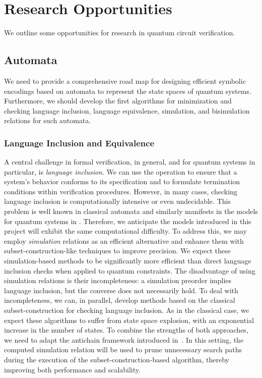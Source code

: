 \section{Research Opportunities}
\label{opportunities:section}
We outline some opportunities for research in quantum circuit verification.

\subsection{Automata}
\label{automata:subsection}
We need to provide a comprehensive road map for designing efficient symbolic encodings based on automata to represent the state spaces of quantum systems.
%
Furthermore, we should develop the first algorithms for minimization and checking language inclusion, language equivalence, simulation, and bisimulation
relations for such automata.
%

\subsubsection{Language Inclusion and Equivalence}
A central challenge in formal verification, in general, and for quantum systems in particular, is \textit{language inclusion}.
%
We can use the operation to ensure that a system's behavior conforms to its specification and to formulate termination conditions within verification procedures.
%
However, in many cases, checking language inclusion is computationally intensive or even undecidable.
%
This problem is well known in classical automata and similarly manifests in the models for quantum systems in \citep{DBLP:journals/pacmpl/AbdullaCCHLLLT25}.
%
Therefore, we anticipate the models introduced in this project will exhibit the same computational difficulty.
%
To address this, we may employ \textit{simulation} relations as an efficient alternative and enhance them with subset-construction-like techniques to improve precision.
%
We expect these simulation-based methods to be significantly more efficient than direct language inclusion checks when applied to quantum constraints.
%
%
The disadvantage of using simulation relations is their incompleteness: a simulation preorder implies language inclusion, but the converse does not necessarily hold.
%
To deal with incompleteness, we can, in parallel, develop methods based on the classical subset-construction for checking language inclusion.
%
As in the classical case, we expect these algorithms to suffer from state space explosion, with an exponential increase in the number of states.
%
To combine the strengths of both approaches, we need to adapt the antichain framework introduced in~\citep{wulfantichains,DBLP:conf/tacas/AbdullaCHMV10}.
%
In this setting, the computed simulation relation will be used to prune unnecessary search paths during the execution of the subset-construction-based algorithm, thereby improving both performance and scalability.
%

